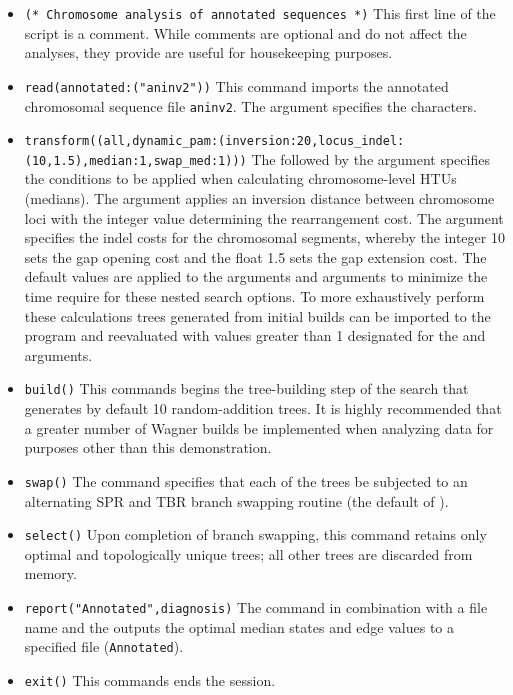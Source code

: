 \begin{itemize}
\item \texttt{(* Chromosome analysis of annotated sequences  *)} This first line of the script is a comment. While comments are optional and do not affect the analyses, they provide are useful for housekeeping purposes.
\item \texttt{read(annotated:("aninv2"))} This command imports the annotated chromosomal sequence file \texttt{aninv2}. The argument  specifies the characters. 
\item \texttt{transform((all,dynamic\_pam:(inversion:20,locus\_indel:\\(10,1.5),median:1,swap\_med:1)))}  The  follow\-ed by the argument  specifies the conditions to be applied when calculating chromosome-level HTUs (medians).  The argument  applies an inversion distance between chromosome loci with the integer value determining the rearrangement cost. The argument  specifies the indel costs for the chromosomal segments, whereby the integer 10 sets the gap opening cost and the float 1.5 sets the gap extension cost.  The default values are applied to the arguments    and  arguments to minimize the time require for these nested search options.   To more exhaustively perform these calculations trees generated from initial builds can be imported to the program and reevaluated with values greater than 1 designated for the  and  arguments.
\item \texttt{build()} This commands begins the tree-building step of the search that generates by default 10 random-addition trees.  It is highly recommended that a greater number of Wagner builds be implemented when analyzing data for purposes other than this demonstration.
\item \texttt{swap()} The  command specifies that each of the trees be subjected to an alternating SPR and TBR branch swapping routine (the default of \poy).
\item \texttt{select()} Upon completion of branch swapping, this command retains only optimal and topologically unique trees; all other trees are discarded from memory. 
\item \texttt{report("Annotated",diagnosis)}  The  command in combination with a file name and the  outputs the optimal median states and edge values to a specified file (\texttt{Annotated}). 
\item \texttt{exit()} This commands ends the \poy session.
\end{itemize}

